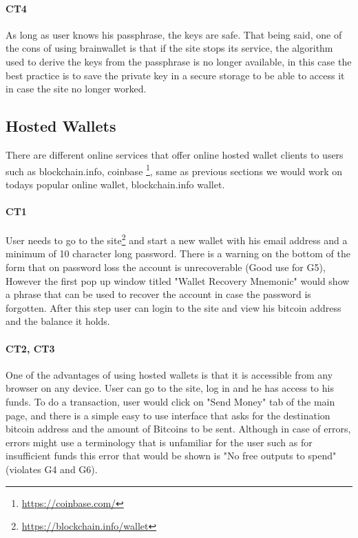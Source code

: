 \paragraph{CT4} As long as user knows his passphrase, the keys are safe. That being said, one of the cons of using brainwallet is that if the site stops its service, the algorithm used to derive the keys from the passphrase is no longer available, in this case the best practice is to save the private key in a secure storage to be able to access it in case the site no longer worked.


\subsection{Hosted Wallets}
\label{hosted}
There are different online services that offer online hosted wallet clients to users such as blockchain.info, coinbase \footnote{\url{https://coinbase.com/}}, same as previous sections we would work on todays popular online wallet, blockchain.info wallet.

\paragraph{CT1} User needs to go to the site\footnote{\url{https://blockchain.info/wallet}} and start a new wallet with his email address and a minimum of 10 character long password. There is a warning on the bottom of the form that on password loss the account is unrecoverable (Good use for G5), However the first pop up window titled "Wallet Recovery Mnemonic" would show a phrase that can be used to recover the account in case the password is forgotten. After this step user can login to the site and view his bitcoin address and the balance it holds.

\paragraph{CT2, CT3}
\label{hosted transaction}
One of the advantages of using hosted wallets is that it is accessible from any browser on any device. User can go to the site, log in and he has access to his funds. To do a transaction, user would click on "Send Money" tab of the main page, and there is a simple easy to use interface that asks for the destination bitcoin address and the amount of Bitcoins to be sent. Although in case of errors, errors might use a terminology that is unfamiliar for the user such as for insufficient funds this error that would be shown is "No free outputs to spend" (violates G4 and G6).


